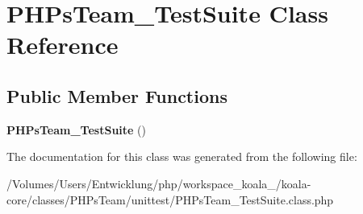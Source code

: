 \hypertarget{class_p_h_ps_team___test_suite}{
\section{PHPsTeam\_\-TestSuite Class Reference}
\label{class_p_h_ps_team___test_suite}
}
\subsection*{Public Member Functions}
\begin{DoxyCompactItemize}
\item 
\hypertarget{class_p_h_ps_team___test_suite_ad4e1e0e93d5618e6fcb473ca2923e884}{
{\bfseries PHPsTeam\_\-TestSuite} ()}
\label{class_p_h_ps_team___test_suite_ad4e1e0e93d5618e6fcb473ca2923e884}

\end{DoxyCompactItemize}


The documentation for this class was generated from the following file:\begin{DoxyCompactItemize}
\item 
/Volumes/Users/Entwicklung/php/workspace\_\-koala\_/koala-\/core/classes/PHPsTeam/unittest/PHPsTeam\_\-TestSuite.class.php\end{DoxyCompactItemize}

